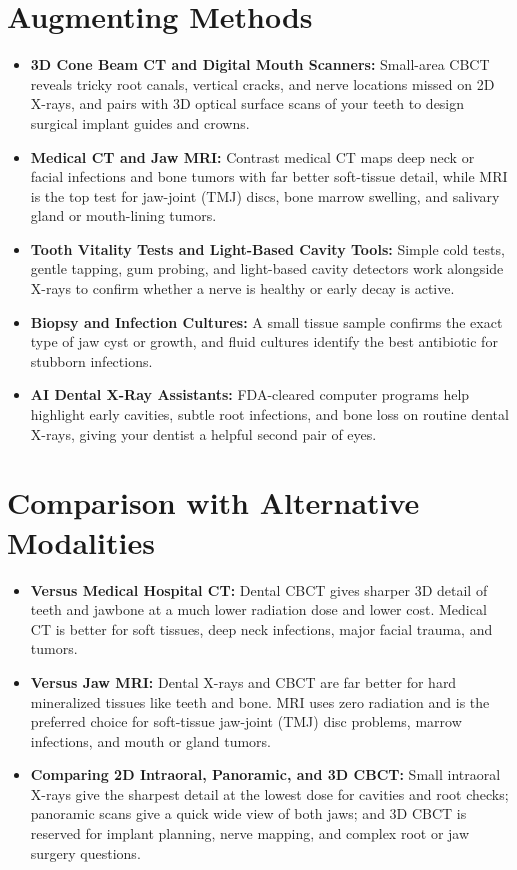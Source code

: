 \section{Augmenting Methods}
\begin{itemize}
\item \textbf{3D Cone Beam CT and Digital Mouth Scanners:} Small-area CBCT reveals tricky root canals, vertical cracks, and nerve locations missed on 2D X-rays, and pairs with 3D optical surface scans of your teeth to design surgical implant guides and crowns.
\item \textbf{Medical CT and Jaw MRI:} Contrast medical CT maps deep neck or facial infections and bone tumors with far better soft-tissue detail, while MRI is the top test for jaw-joint (TMJ) discs, bone marrow swelling, and salivary gland or mouth-lining tumors.
\item \textbf{Tooth Vitality Tests and Light-Based Cavity Tools:} Simple cold tests, gentle tapping, gum probing, and light-based cavity detectors work alongside X-rays to confirm whether a nerve is healthy or early decay is active.
\item \textbf{Biopsy and Infection Cultures:} A small tissue sample confirms the exact type of jaw cyst or growth, and fluid cultures identify the best antibiotic for stubborn infections.
\item \textbf{AI Dental X-Ray Assistants:} FDA-cleared computer programs help highlight early cavities, subtle root infections, and bone loss on routine dental X-rays, giving your dentist a helpful second pair of eyes.
\end{itemize}

\section{Comparison with Alternative Modalities}
\begin{itemize}
\item \textbf{Versus Medical Hospital CT:} Dental CBCT gives sharper 3D detail of teeth and jawbone at a much lower radiation dose and lower cost. Medical CT is better for soft tissues, deep neck infections, major facial trauma, and tumors.
\item \textbf{Versus Jaw MRI:} Dental X-rays and CBCT are far better for hard mineralized tissues like teeth and bone. MRI uses zero radiation and is the preferred choice for soft-tissue jaw-joint (TMJ) disc problems, marrow infections, and mouth or gland tumors.
\item \textbf{Comparing 2D Intraoral, Panoramic, and 3D CBCT:} Small intraoral X-rays give the sharpest detail at the lowest dose for cavities and root checks; panoramic scans give a quick wide view of both jaws; and 3D CBCT is reserved for implant planning, nerve mapping, and complex root or jaw surgery questions.
\end{itemize}

